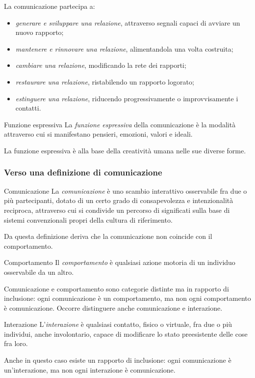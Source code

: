 \documentclass[a4paper]{article}
\begin{document}
La comunicazione partecipa a:
\begin{itemize}
    \item \emph{generare e sviluppare una relazione}, attraverso segnali capaci di avviare un nuovo rapporto;
    \item \emph{mantenere e rinnovare una relazione}, alimentandola una volta costruita;
    \item \emph{cambiare una relazione}, modificando la rete dei rapporti;
    \item \emph{restaurare una relazione}, ristabilendo un rapporto logorato;
    \item \emph{estinguere una relazione}, riducendo progressivamente o improvvisamente i contatti.
\end{itemize}
\begin{snippetdefinition}{Funzione espressiva}
    La \emph{funzione espressiva} della comunicazione è la modalità attraverso cui si manifestano pensieri, emozioni, valori e ideali.
\end{snippetdefinition}
La funzione espressiva è alla base della creatività umana nelle sue diverse forme.
\subsubsection{Verso una definizione di comunicazione}
\begin{snippetdefinition}{Comunicazione}
    La \emph{comunicazione} è uno scambio interattivo osservabile fra due o più partecipanti, dotato di un certo grado di consapevolezza e intenzionalità reciproca, attraverso cui si condivide un percorso di significati sulla base di sistemi convenzionali propri della cultura di riferimento.
\end{snippetdefinition}
Da questa definizione deriva che la comunicazione non coincide con il comportamento.
\begin{snippetdefinition}{Comportamento}
    Il \emph{comportamento} è qualsiasi azione motoria di un individuo osservabile da un altro.
\end{snippetdefinition}
Comunicazione e comportamento sono categorie distinte ma in rapporto di inclusione: ogni comunicazione è un comportamento, ma non ogni comportamento è comunicazione.
Occorre distinguere anche comunicazione e interazione.
\begin{snippetdefinition}{Interazione}
    L'\emph{interazione} è qualsiasi contatto, fisico o virtuale, fra due o più individui, anche involontario, capace di modificare lo stato preesistente delle cose fra loro.
\end{snippetdefinition}
Anche in questo caso esiste un rapporto di inclusione: ogni comunicazione è un'interazione, ma non ogni interazione è comunicazione.
\end{document}
